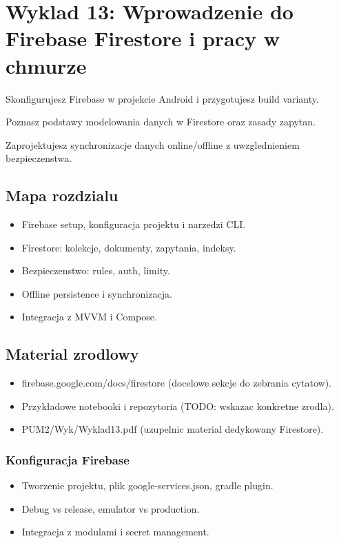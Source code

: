 \chapter{Wyklad 13: Wprowadzenie do Firebase Firestore i pracy w chmurze}

\begin{learningobjectives}
  \item Skonfigurujesz Firebase w projekcie Android i przygotujesz build varianty.
  \item Poznasz podstawy modelowania danych w Firestore oraz zasady zapytan.
  \item Zaprojektujesz synchronizacje danych online/offline z uwzglednieniem bezpieczenstwa.
\end{learningobjectives}

\section{Mapa rozdzialu}
\begin{itemize}
  \item Firebase setup, konfiguracja projektu i narzedzi CLI.
  \item Firestore: kolekcje, dokumenty, zapytania, indeksy.
  \item Bezpieczenstwo: rules, auth, limity.
  \item Offline persistence i synchronizacja.
  \item Integracja z MVVM i Compose.
\end{itemize}

\section{Material zrodlowy}
\begin{itemize}
  \item firebase.google.com/docs/firestore (docelowe sekcje do zebrania cytatow).
  \item Przykładowe notebooki i repozytoria (TODO: wskazac konkretne zrodla).
  \item PUM2/Wyk/Wyklad13.pdf (uzupelnic material dedykowany Firestore).
\end{itemize}

\subsection{Konfiguracja Firebase}
\begin{itemize}
  \item Tworzenie projektu, plik google-services.json, gradle plugin.
  \item Debug vs release, emulator vs production.
  \item Integracja z modulami i secret management.
\end{itemize}


